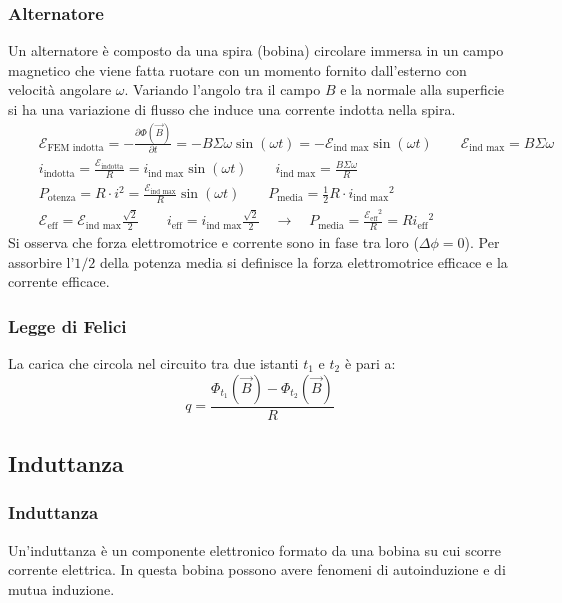 \documentclass[a4paper]{article}
\begin{document}
\subsubsection*{Alternatore}
Un alternatore è composto da una spira (bobina) circolare immersa in un campo magnetico che viene fatta ruotare con un momento
fornito dall'esterno con velocità angolare \(\omega\). Variando l'angolo tra il campo \(B\) e la normale alla superficie si ha
una variazione di flusso che induce una corrente indotta nella spira.
\begin{align*}
	&\quad \mathcal{E}_\text{FEM indotta} = - \frac{\partial \Phi(\vec{B})}{\partial t} = - B \Sigma \omega \sin (\omega t) = - \mathcal{E}_\text{ind max} \sin(\omega t) \qquad \mathcal{E}_\text{ind max} = B \Sigma \omega \\
	&\quad i_\text{indotta} = \frac{\mathcal{E}_\text{indotta}}{R} = i_\text{ind max} \sin(\omega t) \qquad i_\text{ind max} = \frac{B \Sigma \omega}{R} \\
	&\quad P_\text{otenza} = R \cdot i^2 = \frac{\mathcal{E}_\text{ind max}}{R} \sin (\omega t) \qquad P_\text{media} = \frac{1}{2} R \cdot {i_\text{ind max}}^2 \\
	&\quad \mathcal{E}_\text{eff} = \mathcal{E}_\text{ind max} \frac{\sqrt{2}}{2} \qquad i_\text{eff} = i_\text{ind max} \frac{\sqrt{2}}{2} \quad \rightarrow \quad P_\text{media} = \frac{{\mathcal{E}_\text{eff}}^2}{R} =  R {i_\text{eff}}^2
\end{align*}
Si osserva che forza elettromotrice e corrente sono in fase tra loro (\(\Delta\phi = 0\)). Per assorbire l'\(1/2\) della potenza
media si definisce la forza elettromotrice efficace e la corrente efficace.

\subsubsection*{Legge di Felici}
La carica che circola nel circuito tra due istanti \(t_1\) e \(t_2\) è pari a:
\[q = \frac{\Phi_{t_1}(\vec{B}) - \Phi_{t_2}(\vec{B})}{R}\]

\newpage

\subsection{Induttanza}
\subsubsection*{Induttanza}
Un'induttanza è un componente elettronico formato da una bobina su cui scorre corrente elettrica. In questa bobina possono avere
fenomeni di autoinduzione e di mutua induzione.
\end{document}
